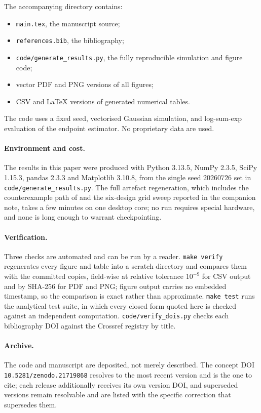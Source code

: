 \documentclass[11pt]{article}
\theoremstyle{definition}
\begin{document}
The accompanying directory contains:
\begin{itemize}
\item \texttt{main.tex}, the manuscript source;
\item \texttt{references.bib}, the bibliography;
\item \texttt{code/generate\_results.py}, the fully reproducible simulation and figure code;
\item vector PDF and PNG versions of all figures;
\item CSV and LaTeX versions of generated numerical tables.
\end{itemize}
The code uses a fixed seed, vectorised Gaussian simulation, and log-sum-exp evaluation of the endpoint estimator. No proprietary data are used.

\paragraph{Environment and cost.} The results in this paper were produced with Python 3.13.5, NumPy 2.3.5, SciPy 1.15.3, pandas 2.3.3 and Matplotlib 3.10.8, from the single seed $20260726$ set in \texttt{code/generate\_results.py}. The full artefact regeneration, which includes the counterexample path of  and the six-design grid sweep reported in the companion note, takes a few minutes on one desktop core; no run requires special hardware, and none is long enough to warrant checkpointing.

\paragraph{Verification.} Three checks are automated and can be run by a reader. \texttt{make verify} regenerates every figure and table into a scratch directory and compares them with the committed copies, field-wise at relative tolerance $10^{-9}$ for CSV output and by SHA-256 for PDF and PNG; figure output carries no embedded timestamp, so the comparison is exact rather than approximate. \texttt{make test} runs the analytical test suite, in which every closed form quoted here is checked against an independent computation. \texttt{code/verify\_dois.py} checks each bibliography DOI against the Crossref registry by title.

\paragraph{Archive.} The code and manuscript are deposited, not merely described. The concept DOI \texttt{10.5281/zenodo.21719868} resolves to the most recent version and is the one to cite; each release additionally receives its own version DOI, and superseded versions remain resolvable and are listed with the specific correction that supersedes them.

\printbibliography
\end{document}
